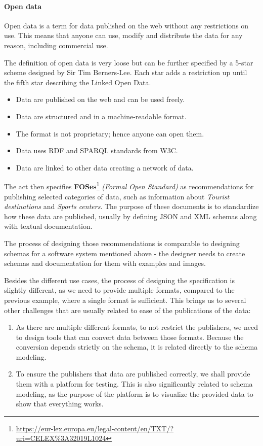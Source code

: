 \paragraph{Open data} Open data is a term for data published on the web without any restrictions on use. This means that anyone can use, modify and distribute the data for any reason, including commercial use.

The definition of open data is very loose but can be further specified by a 5-star scheme designed by Sir Tim Berners-Lee. Each star adds a restriction up until the fifth star describing the Linked Open Data.
\begin{itemize}[noitemsep,leftmargin=2cm]
    \item [1 $\bigstar$] Data are published on the web and can be used freely.
    \item [2 $\bigstar$] Data are structured and in a machine-readable format.
    \item [3 $\bigstar$] The format is not proprietary; hence anyone can open them.
    \item [4 $\bigstar$] Data uses RDF and SPARQL standards from W3C.
    \item [5 $\bigstar$] Data are linked to other data creating a network of data.
\end{itemize}

\bigskip

The act then specifies \textbf{FOSes}\footnote{\url{https://eur-lex.europa.eu/legal-content/en/TXT/?uri=CELEX\%3A32019L1024}} \textit{(Formal Open Standard)} as recommendations for publishing selected categories of data, such as information about \textit{Tourist destinations} and \textit{Sports centers}. The purpose of these documents is to standardize how these data are published, usually by defining JSON and XML schemas along with textual documentation.

The process of designing those recommendations is comparable to designing schemas for a software system mentioned above - the designer needs to create schemas and documentation for them with examples and images.

Besides the different use cases, the process of designing the specification is slightly different, as we need to provide multiple formats, compared to the previous example, where a single format is sufficient. This brings us to several other challenges that are usually related to ease of the publications of the data:
\begin{enumerate}
  \item As there are multiple different formats, to not restrict the publishers, we need to design tools that can convert data between those formats. Because the conversion depends strictly on the schema, it is related directly to the schema modeling.
  \item To ensure the publishers that data are published correctly, we shall provide them with a platform for testing. This is also significantly related to schema modeling, as the purpose of the platform is to visualize the provided data to show that everything works.
\end{enumerate}

